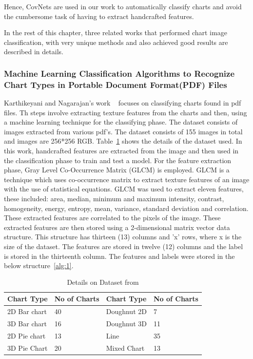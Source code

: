 \documentclass[12pt, a4paper,oneside]{report}
\begin{document}
Hence, CovNets are used in our work to automatically classify charts and avoid the cumbersome task of having to extract handcrafted features.\newline


In the rest of this chapter, three related works that performed chart image classification, with very unique methods and also achieved good results are described in details.  

\subsubsection{Machine Learning Classification Algorithms to Recognize Chart Types in Portable Document Format(PDF) Files}
Karthikeyani and Nagarajan's work ~\cite{karthikeyani2012machine} focuses on classifying charts found in pdf files. Th steps involve extracting texture features from the charts and then, using a machine learning technique for the classifying phase.
The dataset consists of images extracted from various pdf's. The dataset consists of 155 images in total and  images are 256*256 RGB. Table~\ref{table:pdf} shows the details of the dataset used. In this work, handcrafted features are extracted from the image and then used in the classification phase to train and test a model.
For the feature extraction phase, Gray Level Co-Occurrence Matrix (GLCM) is employed. GLCM is a technique which uses co-occurrence matrix to extract texture features of an image with the use of statistical equations. GLCM was used to extract eleven features, these included: area, median, minimum and maximum intensity, contrast, homogeneity, energy, entropy, mean, variance, standard deviation and correlation. These extracted features are correlated to the pixels of the image. These extracted features are then stored using a 2-dimensional matrix vector data structure. This structure has thirteen (13) columns and 'x' rows, where x is the size of the dataset. The features are stored in twelve (12) columns and the label is stored in the thirteenth column. The features and labels were stored in the below structure~\ref{alg:1}.

\begin{table}[h]
	\centering {} \small
	\begin{tabular}{|p{3cm}|p{3cm}|p{3cm}|p{3cm}|}
		\hline
		Chart Type & No of Charts & Chart
		Type & No of Charts  \\ \hline
		2D Bar chart & 40 & Doughnut 2D & 7 \\ \hline
		3D Bar chart & 16 & Doughnut 3D & 11\\ \hline
		2D Pie chart & 13 & Line & 35 \\ \hline
		3D Pie Chart & 20 & Mixed Chart& 13 \\ \hline
	\end{tabular}
	\caption {Details on Dataset from \cite{karthikeyani2012machine} }	
	\label{table:pdf}
\end{table}
\end{document}
